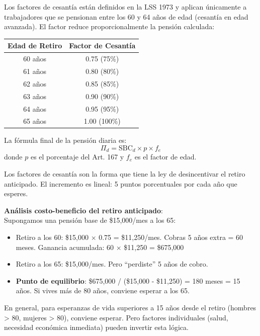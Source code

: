 \documentclass[11pt,a4paper]{report}
\begin{document}
\begin{tcolorbox}[colback=blue!5!white, colframe=blue!75!black, title=\textbf{Definici\'on Formal}]
Los factores de cesant\'ia est\'an definidos en la LSS 1973 y aplican \'unicamente a trabajadores que se pensionan entre los 60 y 64 a\~nos de edad (cesant\'ia en edad avanzada). El factor reduce proporcionalmente la pensi\'on calculada:

\begin{center}
\begin{tabular}{cc}
\toprule
\textbf{Edad de Retiro} & \textbf{Factor de Cesant\'ia} \\
\midrule
60 a\~nos & 0.75 (75\%) \\
61 a\~nos & 0.80 (80\%) \\
62 a\~nos & 0.85 (85\%) \\
63 a\~nos & 0.90 (90\%) \\
64 a\~nos & 0.95 (95\%) \\
65 a\~nos & 1.00 (100\%) \\
\bottomrule
\end{tabular}
\end{center}

La f\'ormula final de la pensi\'on diaria es:
\[
\Pi_d = \text{SBC}_d \times p \times f_e
\]
donde $p$ es el porcentaje del Art. 167 y $f_e$ es el factor de edad.
\end{tcolorbox}

\begin{tcolorbox}[colback=green!5!white, colframe=green!50!black, title=\textbf{Intuici\'on}]
Los factores de cesant\'ia son la forma que tiene la ley de desincentivar el retiro anticipado. El incremento es lineal: 5 puntos porcentuales por cada a\~no que esperes.

\textbf{An\'alisis costo-beneficio del retiro anticipado}:\\
Supongamos una pensi\'on base de \$15,000/mes a los 65:
\begin{itemize}[nosep]
\item Retiro a los 60: \$15,000 $\times$ 0.75 = \$11,250/mes. Cobras 5 a\~nos extra = 60 meses. Ganancia acumulada: 60 $\times$ \$11,250 = \$675,000
\item Retiro a los 65: \$15,000/mes. Pero ``perdiste'' 5 a\~nos de cobro.
\item \textbf{Punto de equilibrio}: \$675,000 / (\$15,000 - \$11,250) = 180 meses = 15 a\~nos. Si vives m\'as de 80 a\~nos, conviene esperar a los 65.
\end{itemize}

En general, para esperanzas de vida superiores a 15 a\~nos desde el retiro (hombres > 80, mujeres > 80), conviene esperar. Pero factores individuales (salud, necesidad econ\'omica inmediata) pueden invertir esta l\'ogica.
\end{tcolorbox}
\end{document}

